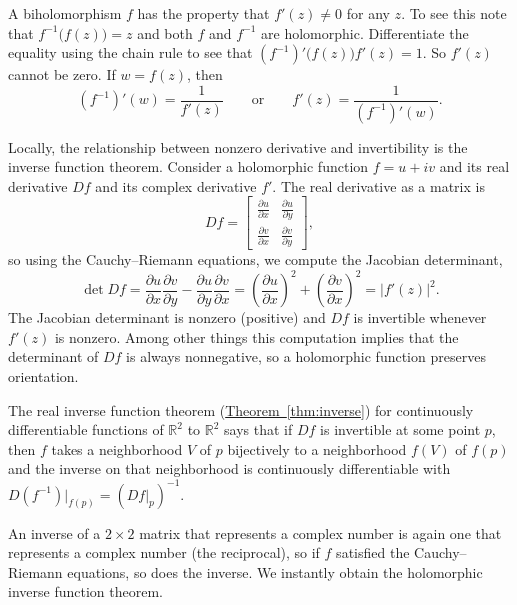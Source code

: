 \documentclass[12pt,openany]{book}
\newcommand{\abs}[1]{\left\lvert {#1} \right\rvert}
\newcommand{\R}{{\mathbb{R}}}
\theoremstyle{plain}
\theoremstyle{remark}
\theoremstyle{definition}
\theoremstyle{exercise}
\theoremstyle{example}
\newcommand{\thmref}[1]{\hyperref[#1]{Theorem~\ref*{#1}}}
\begin{document}
A biholomorphism $f$ has the property that $f'(z) \not= 0$ for any $z$.  To
see this note that $f^{-1}\bigl(f(z)\bigr) = z$ and both $f$ and $f^{-1}$
are holomorphic.  Differentiate the equality using the chain rule to see
that $(f^{-1})' \bigl(f(z)\bigr) f'(z) = 1$.  So $f'(z)$ cannot be zero.
If $w = f(z)$, then
\begin{equation*}
(f^{-1})'(w) = \frac{1}{f'(z)}
\qquad \text{or} \qquad
f'(z) =
\frac{1}{(f^{-1})'(w)} .
\end{equation*}

Locally, the relationship between nonzero derivative and invertibility is
the inverse function theorem.  Consider a holomorphic function
$f = u+iv$ and its real derivative $Df$ and its complex derivative $f'$.
The real derivative as a matrix is
\begin{equation*}
Df =
\begin{bmatrix}
\frac{\partial u}{\partial x} & \frac{\partial u}{\partial y} \\[5pt]
\frac{\partial v}{\partial x} & \frac{\partial v}{\partial y}
\end{bmatrix} ,
\end{equation*}
so using the Cauchy--Riemann equations, we compute the Jacobian determinant,
\begin{equation*}
\det Df =
\frac{\partial u}{\partial x}
\frac{\partial v}{\partial y} -
\frac{\partial u}{\partial y} 
\frac{\partial v}{\partial x}
=
{\left(\frac{\partial u}{\partial x}\right)}^2
+
{\left(\frac{\partial v}{\partial x}\right)}^2
=
\abs{f'(z)}^2 .
\end{equation*}
The Jacobian determinant is nonzero (positive) and $Df$ is invertible
whenever $f'(z)$ is nonzero.
Among other things this computation
implies that the determinant of
$Df$ is always nonnegative, so a holomorphic function preserves orientation.

The real inverse function theorem (\thmref{thm:inverse})
for continuously differentiable
functions of $\R^2$ to $\R^2$
says that if $Df$ is invertible at some point $p$, then $f$ takes a
neighborhood $V$ of $p$ bijectively to a neighborhood $f(V)$
of $f(p)$ and the inverse on that neighborhood is continuously
differentiable with $D(f^{-1})|_{f(p)} = (Df|_p)^{-1}$.

An inverse of a $2 \times 2$ matrix that represents a complex number is
again one that represents a complex number (the reciprocal), so if $f$
satisfied the Cauchy--Riemann equations, so does the inverse.  We 
instantly obtain the holomorphic inverse function theorem.
\end{document}
